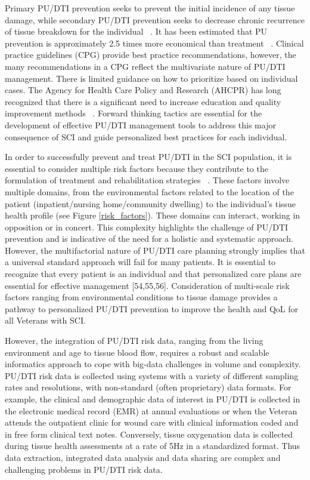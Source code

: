 \documentclass{amia}
\begin{document}
Primary PU/DTI prevention seeks to prevent the initial incidence of any tissue damage, while secondary PU/DTI prevention seeks to decrease chronic recurrence of tissue breakdown for the individual ~\cite{ref7}. It has been estimated that PU prevention is approximately 2.5 times more economical than treatment ~\cite{ref8}. Clinical practice guidelines (CPG) provide best practice recommendations, however, the many recommendations in a CPG reflect the multivariate nature of PU/DTI management. There is limited guidance on how to prioritize based on individual cases. The Agency for Health Care Policy and Research (AHCPR) has long recognized that there is a significant need to increase education and quality improvement methods ~\cite{ref9}. Forward thinking tactics are essential for the development of effective PU/DTI management tools to address this major consequence of SCI and guide personalized best practices for each individual.

In order to successfully prevent and treat PU/DTI in the SCI population, it is essential to consider multiple risk factors because they contribute to the formulation of treatment and rehabilitation strategies ~\cite{ref10}. These factors involve multiple domains, from the environmental factors related to the location of the patient (inpatient/nursing home/community dwelling) to the individual’s tissue health profile (see Figure \ref{risk_factors}). These domains can interact, working in opposition or in concert. This complexity highlights the challenge of PU/DTI prevention and is indicative of the need for a holistic and systematic approach. However, the multifactorial nature of PU/DTI care planning strongly implies that a universal standard approach will fail for many patients. It is essential to recognize that every patient is an individual and that personalized care plans are essential for effective management [54,55,56]. Consideration of multi-scale risk factors ranging from environmental conditions to tissue damage provides a pathway to personalized PU/DTI prevention to improve the health and QoL for all Veterans with SCI.

However, the integration of PU/DTI risk data, ranging from the living environment and age to tissue blood flow, requires a robust and scalable informatics approach to cope with big-data challenges in volume and complexity. PU/DTI risk data is collected using systems with a variety of different sampling rates and resolutions, with non-standard (often proprietary) data formats. For example, the clinical and demographic data of interest in PU/DTI is collected in the electronic medical record (EMR) at annual evaluations or when the Veteran attends the outpatient clinic for wound care with clinical information coded and in free form clinical text notes. Conversely, tissue oxygenation data is collected during tissue health assessments at a rate of 5Hz in a standardized format. Thus data extraction, integrated data analysis and data sharing are complex and challenging problems in PU/DTI risk data.
\end{document}
